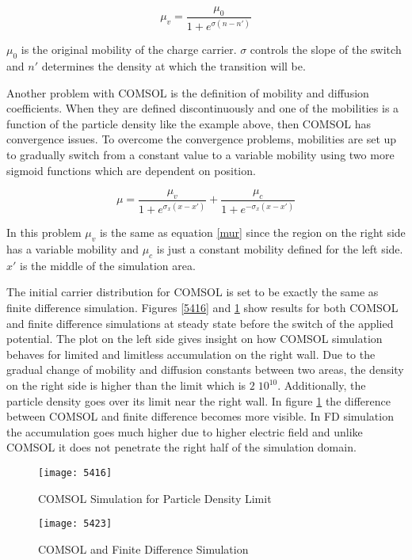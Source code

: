 \begin{doublespace}
\begin{equation}
\mu_v = \frac{\mu_{0}}{1+e^{\sigma(n-n')}}
\label{mur}
\end{equation} 

$\mu_0$ is the original mobility of the charge carrier. $\sigma$ controls the slope of the switch and $n'$ determines the density at which the transition will be. 

Another problem with COMSOL is the definition of mobility and diffusion coefficients. When they are defined discontinuously and one of the mobilities is a function of the particle density like the example above, then COMSOL has convergence issues. To overcome the convergence problems, mobilities are set up to gradually switch from a constant value to a variable mobility using two more sigmoid functions which are dependent on position.

\begin{equation}
\mu=\frac{\mu_{v}}{1+e^{\sigma_x(x-x')}}+\frac{\mu_{c}}{1+e^{-\sigma_x(x-x')}}
\end{equation}

In this problem $\mu_v$ is the same as equation \ref{mur} since the region on the right side has a variable mobility and $\mu_c$ is just a constant mobility defined for the left side. $x'$ is the middle of the simulation area.

The initial carrier distribution for COMSOL is set to be exactly the same as finite difference simulation. Figures \ref{5416} and \ref{5423} show results for both COMSOL and finite difference simulations at steady state before the switch of the applied potential. The plot on the left side gives insight on how COMSOL simulation behaves for limited and limitless accumulation on the right wall. Due to the gradual change of mobility and diffusion constants between two areas, the density on the right side is higher than the limit which is $2 \; 10^{10}$. Additionally, the particle density goes over its limit near the right wall. In figure \ref{5423} the difference between COMSOL and finite difference becomes more visible. In FD simulation the accumulation goes much higher due to higher electric field and unlike COMSOL it does not penetrate the right half of the simulation domain. 

\begin{figure}[ht]
\centering
\begin{minipage}[b]{0.45\linewidth}
\texttt{[image: 5416]}
\caption{COMSOL Simulation for Particle Density Limit}
\label{5416}
\end{minipage}
\quad
\begin{minipage}[b]{0.45\linewidth}
\texttt{[image: 5423]}
\caption{COMSOL and Finite Difference Simulation}
\label{5423}
\end{minipage}
\end{figure}


\end{doublespace}
